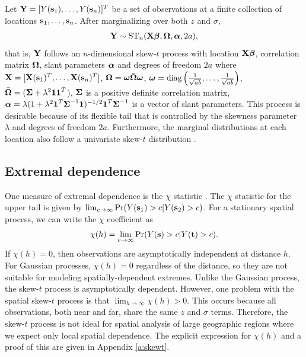 \documentclass[11pt]{article}
\begin{document}
Let $\mbox{\bf Y} = [Y(\mbox{\bf s}_1), \ldots, Y(\mbox{\bf s}_n)]^T$ be a set of observations at a finite collection of locations $\mbox{\bf s}_1, \ldots, \mbox{\bf s}_n$.
After marginalizing over both $z$ and $\sigma$,
\begin{align}
  \mbox{\bf Y} \sim \text{ST}_n(\mbox{\bf X} \mbox{\boldmath $\beta$}, \mbox{\boldmath $\Omega$}, \mbox{\boldmath $\alpha$}, 2a), \label{eq:fullmodel}
\end{align}
that is, $\mbox{\bf Y}$ follows an $n$-dimensional skew-$t$ process with location $\mbox{\bf X} \mbox{\boldmath $\beta$}$, correlation matrix $\mbox{\boldmath $\Omega$}$, slant parameters $\mbox{\boldmath $\alpha$}$ and degrees of freedom $2a$ where $\mbox{\bf X} = [\mbox{\bf X}(\mbox{\bf s}_1)^T, \ldots, \mbox{\bf X}(\mbox{\bf s}_n)^T]$, $\mbox{\boldmath $\Omega$} = \mbox{\boldmath $\omega$} \bar{\mbox{\boldmath $\Omega$}} \mbox{\boldmath $\omega$}$, $\mbox{\boldmath $\omega$} = \text{diag}\left(\frac{1}{ \sqrt{ab}}, \ldots, \frac{1}{\sqrt{ab}}\right)$, $\bar{\mbox{\boldmath $\Omega$}} = (\mbox{\boldmath $\Sigma$} + \lambda^2 \mbox{\boldmath $1$} \mbox{\boldmath $1$}^T$), $\mbox{\boldmath $\Sigma$}$ is a positive definite correlation matrix, $\mbox{\boldmath $\alpha$} = \lambda (1 + \lambda^2 \mbox{\boldmath $1$}^T \mbox{\boldmath $\Sigma$}^{-1} \mbox{\boldmath $1$})^{-1/2} \mbox{\boldmath $1$}^T \mbox{\boldmath $\Sigma$}^{-1}$ is a vector of slant parameters.
This process is desirable because of its flexible tail that is controlled by the skewness parameter $\lambda$ and degrees of freedom $2a$.
Furthermore, the marginal distributions at each location also follow a univariate skew-$t$ distribution \citep{Azzalini2013}.

\subsection{Extremal dependence}
One measure of extremal dependence is the $\chi$ statistic \citep{Padoan2011}.
The $\chi$ statistic for the upper tail is given by $\lim_{c \rightarrow \infty} \Pr(Y(\mbox{\bf s}_1) > c | Y(\mbox{\bf s}_2) > c)$.
For a stationary spatial process, we can write the $\chi$ coefficient as
\begin{align}
  \chi(h) = \lim_{c \rightarrow \infty} \Pr(Y(\mbox{\bf s}) > c | Y(\mbox{\bf t}) > c).
\end{align}
If $\chi(h) = 0$, then observations are asymptotically independent at distance $h$.
For Gaussian processes, $\chi(h) = 0$ regardless of the distance, so they are not suitable for modeling spatially-dependent extremes.
Unlike the Gaussian process, the skew-$t$ process is asymptotically dependent.
However, one problem with the spatial skew-$t$ process is that $\lim_{h \rightarrow \infty} \chi(h) > 0$.
This occurs because all observations, both near and far, share the same $z$ and $\sigma$ terms.
Therefore, the skew-$t$ process is not ideal for spatial analysis of large geographic regions where we expect only local spatial dependence.
The explicit expression for $\chi(h)$ \citep{Padoan2011} and a proof of this are given in Appendix \ref{a:skewt}.
\end{document}
